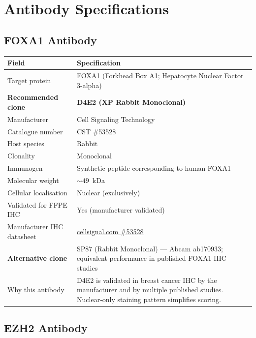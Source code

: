 \documentclass[11pt, a4paper]{article}
\begin{document}
\section{Antibody Specifications}

\subsection{FOXA1 Antibody}

\begin{center}
\begin{tabular}{p{4.5cm}p{9cm}}
\toprule
\textbf{Field} & \textbf{Specification} \\
\midrule
Target protein & FOXA1 (Forkhead Box A1;
    Hepatocyte Nuclear Factor 3-alpha) \\[0.3em]
\textbf{Recommended clone} &
    \textbf{D4E2 (XP Rabbit Monoclonal)} \\[0.3em]
Manufacturer & Cell Signaling Technology \\[0.3em]
Catalogue number & CST \#53528 \\[0.3em]
Host species & Rabbit \\[0.3em]
Clonality & Monoclonal \\[0.3em]
Immunogen & Synthetic peptide corresponding
    to human FOXA1 \\[0.3em]
Molecular weight & ${\sim}49$~kDa \\[0.3em]
Cellular localisation & Nuclear (exclusively) \\[0.3em]
Validated for FFPE IHC & Yes (manufacturer
    validated) \\[0.3em]
Manufacturer IHC datasheet &
    \href{https://www.cellsignal.com/products/primary-antibodies/foxa1-d4e2-xp-rabbit-mab/53528}
    {cellsignal.com \#53528} \\[0.3em]
\textbf{Alternative clone} &
    SP87 (Rabbit Monoclonal) ---
    Abcam ab170933;
    equivalent performance in
    published FOXA1 IHC studies \\[0.3em]
Why this antibody & D4E2 is validated in
    breast cancer IHC by the manufacturer
    and by multiple published studies.
    Nuclear-only staining pattern simplifies
    scoring. \\
\bottomrule
\end{tabular}
\end{center}

\subsection{EZH2 Antibody}
\end{document}
